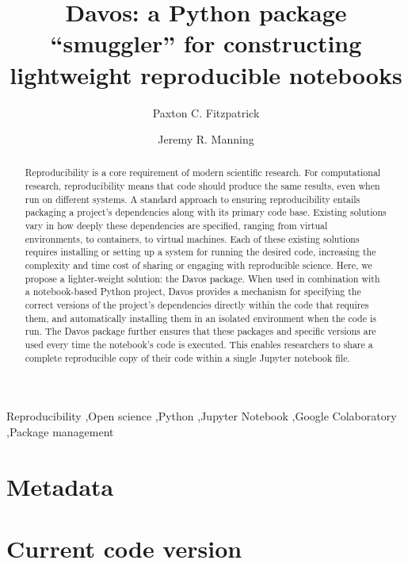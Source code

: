 \documentclass[preprint,12pt,a4paper]{elsarticle}
\begin{document}
\begin{frontmatter}

\title{Davos: a Python package ``smuggler'' for constructing
  lightweight reproducible notebooks}
\author{Paxton C. Fitzpatrick}
\author{Jeremy R. Manning}
\address{Department of Psychological and Brain Sciences\\Dartmouth College, Hanover, NH 03755}


\begin{abstract}
  Reproducibility is a core requirement of modern scientific research.
  For computational research, reproducibility means that code should
  produce the same results, even when run on different systems.  A
  standard approach to ensuring reproducibility entails packaging a
  project's dependencies along with its primary code base.  Existing
  solutions vary in how deeply these dependencies are specified,
  ranging from virtual environments, to containers, to virtual
  machines.  Each of these existing solutions requires installing or
  setting up a system for running the desired code, increasing the
  complexity and time cost of sharing or engaging with reproducible
  science. Here, we propose a lighter-weight solution: the
  Davos package.  When used in combination with a
  notebook-based Python project, Davos provides a mechanism
  for specifying the correct versions of the project's
  dependencies directly within the code that requires them,
  and automatically installing them in an isolated environment
  when the code is run. The Davos package further
  ensures that these packages and specific versions are used every
  time the notebook's code is executed.  This enables researchers to
  share a complete reproducible copy of their code within a single
  Jupyter notebook file.
\end{abstract}


\begin{keyword}
  Reproducibility \sep Open science \sep Python \sep Jupyter Notebook
  \sep Google Colaboratory \sep Package management
\end{keyword}

\end{frontmatter}


\section*{Metadata}

\section*{Current code version}
\end{document}
